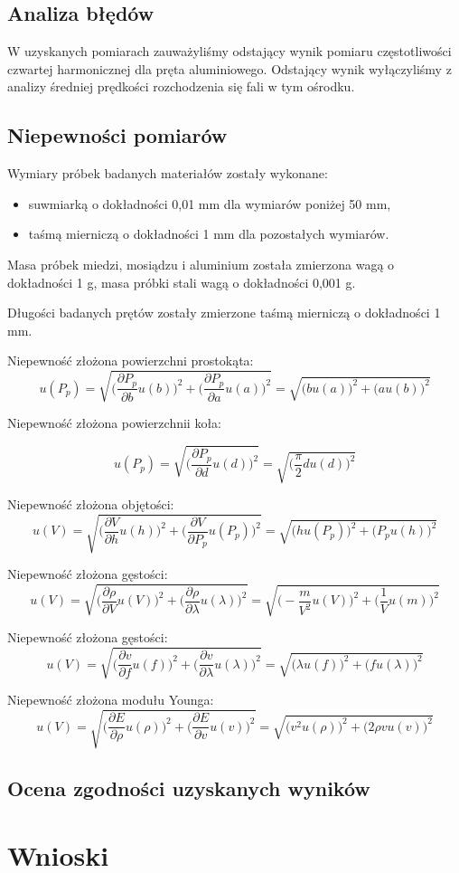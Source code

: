 \documentclass[a4paper,10pt,twoside]{article}
\begin{document}
\subsection{Analiza błędów}

W uzyskanych pomiarach zauważyliśmy odstający wynik pomiaru częstotliwości czwartej harmonicznej dla pręta aluminiowego. Odstający wynik wyłączyliśmy z analizy średniej prędkości rozchodzenia się fali w tym ośrodku.

\subsection{Niepewności pomiarów}

Wymiary próbek badanych materiałów zostały wykonane:
\begin{itemize}
  \item suwmiarką o dokładności 0,01 mm dla wymiarów poniżej 50 mm,
  \item taśmą mierniczą o dokładności 1 mm dla pozostałych wymiarów.
\end{itemize}



Masa próbek miedzi, mosiądzu i aluminium została zmierzona wagą o dokładności 1 g, masa próbki stali wagą o dokładności 0,001 g.

Długości badanych prętów zostały zmierzone taśmą mierniczą o dokładności 1 mm.


Niepewność złożona powierzchni prostokąta:
$$u(P_p)=\sqrt{\Big(\frac{\partial P_p}{\partial b}u(b)\Big)^2 + \Big(\frac{\partial P_p}{\partial a}u(a)\Big)^2}=\sqrt{\Big(bu(a)\big)^2 + \big( au(b)\Big)^2}$$


Niepewność złożona powierzchnii koła:

$$ u(P_p)=\sqrt{\Big(\frac{\partial P_p}{\partial d}u(d)\Big)^2} = \sqrt{\Big(\frac{\pi}{2}du(d)\Big)^2}$$

Niepewność złożona objętości:
$$u(V)=\sqrt{\Big(\frac{\partial V}{\partial h}u(h)\Big)^2 + \Big(\frac{\partial V}{\partial P_p}u(P_p)\Big)^2}=\sqrt{\Big(hu(P_p)\big)^2 + \big( P_pu(h)\Big)^2}$$

Niepewność złożona gęstości:
$$u(V)=\sqrt{\Big(\frac{\partial \rho}{\partial V}u(V)\Big)^2 + \Big(\frac{\partial \rho}{\partial \lambda}u(\lambda)\Big)^2}=\sqrt{\Big(-\frac{m}{V^2}u(V)\Big)^2+\Big(\frac{1}{V}u(m)\Big)^2}$$

Niepewność złożona gęstości:
$$u(V)=\sqrt{\Big(\frac{\partial v}{\partial f}u(f)\Big)^2 + \Big(\frac{\partial v}{\partial \lambda}u(\lambda)\Big)^2}=\sqrt{\Big(\lambda u(f)\big)^2 + \big( fu(\lambda)\Big)^2}$$

Niepewność złożona modułu Younga:
$$u(V)=\sqrt{\Big(\frac{\partial E}{\partial \rho}u(\rho)\Big)^2 + \Big(\frac{\partial E}{\partial v} u(v)\Big)^2}=\sqrt{\Big(v^2 u(\rho)\big)^2 + \big( 2\rho v u(v)\Big)^2}$$

\subsection{Ocena zgodności uzyskanych wyników}

\section{Wnioski}
\end{document}
